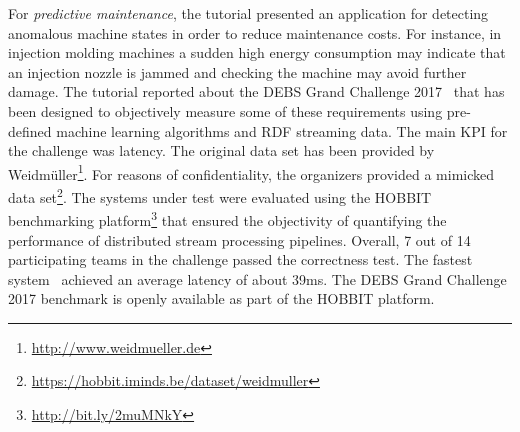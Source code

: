 For \emph{predictive maintenance}, the tutorial presented an application for detecting anomalous machine states in order to reduce maintenance costs. For instance, in injection molding machines a sudden high energy consumption may indicate that an injection nozzle is jammed and checking the machine may avoid further damage. The tutorial reported about the DEBS Grand Challenge 2017~\cite{gulisano_et_al_2017} that has been designed to objectively measure some of these requirements using pre-defined machine learning algorithms and RDF streaming data. The main KPI for the challenge was latency. The original data set has been provided by \textsf{Weidmüller}\footnote{\url{http://www.weidmueller.de}}. For reasons of confidentiality, the organizers provided a mimicked data set\footnote{\url{https://hobbit.iminds.be/dataset/weidmuller}}. The systems under test were evaluated using the \textsf{HOBBIT} benchmarking platform\footnote{\url{http://bit.ly/2muMNkY}} that ensured the objectivity of quantifying the performance of distributed stream processing pipelines. Overall, 7 out of 14 participating teams in the challenge passed the correctness test. The fastest system~\cite{amariei_et_al_2017} achieved an average latency of about 39ms. The DEBS Grand Challenge 2017 benchmark is openly available as part of the HOBBIT platform.







